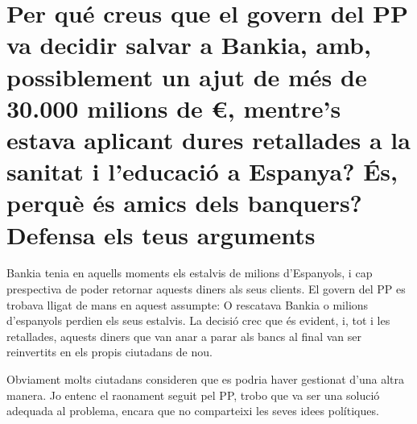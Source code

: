 \section {
  Per qué creus que el govern del PP va decidir salvar a Bankia, amb,
  possiblement un ajut de més de 30.000 milions de €, 
  mentre’s estava aplicant dures
  retallades a la sanitat i l’educació a Espanya? 
  És, perquè és amics dels banquers?
  Defensa els teus arguments
}

Bankia tenia en aquells moments els estalvis de milions d'Espanyols, i cap
prespectiva de poder retornar aquests diners als seus clients. El govern 
del PP es trobava lligat de mans en aquest assumpte: O rescatava Bankia
o milions d'espanyols perdien els seus estalvis. La decisió crec que 
és evident, i, tot i les retallades, aquests diners que van anar a parar
als bancs al final van ser reinvertits en els propis ciutadans de nou.

Obviament molts ciutadans consideren que es podria haver gestionat d'una 
altra manera. Jo entenc el raonament seguit pel PP, trobo que va ser una
solució adequada al problema, encara que no comparteixi les seves idees
polítiques.
